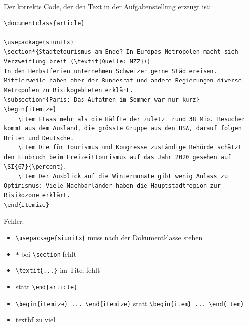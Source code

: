 \begin{questions}
\begin{solution}
Der korrekte Code, der den Text in der Aufgabenstellung erzeugt ist:
\begin{lstlisting}[style=LaTeX]
\documentclass{article}

\usepackage{siunitx}
\section*{Städtetourismus am Ende? In Europas Metropolen macht sich Verzweiflung breit (\textit{Quelle: NZZ})}
In den Herbstferien unternehmen Schweizer gerne Städtereisen. Mittlerweile haben aber der Bundesrat und andere Regierungen diverse Metropolen zu Risikogebieten erklärt.
\subsection*{Paris: Das Aufatmen im Sommer war nur kurz}
\begin{itemize}
    \item Etwas mehr als die Hälfte der zuletzt rund 38 Mio. Besucher kommt aus dem Ausland, die grösste Gruppe aus den USA, darauf folgen Briten und Deutsche.
    \item Die für Tourismus und Kongresse zuständige Behörde schätzt den Einbruch beim Freizeittourismus auf das Jahr 2020 gesehen auf \SI{67}{\percent}.
    \item Der Ausblick auf die Wintermonate gibt wenig Anlass zu Optimismus: Viele Nachbarländer haben die Hauptstadtregion zur Risikozone erklärt. 
\end{itemize}

\end{lstlisting}
Fehler:
\begin{itemize}
	\item \lstinline[style=LaTeX]|\usepackage{siunitx}| muss nach der Dokumentklasse stehen
    \item \texttt{*} bei \lstinline[style=LaTeX]|\section| fehlt
    \item \lstinline[style=LaTeX]|\textit{...}| im Titel fehlt
    \item \lstinline[style=LaTeX]|| statt \lstinline[style=LaTeX]|\end{article}|
    \item \lstinline[style=LaTeX]|\begin{itemize} ... \end{itemize}| statt \lstinline[style=LaTeX]|\begin{item} ... \end{item}|
    \item textbf zu viel
\end{itemize}
\end{solution}


\end{questions}
